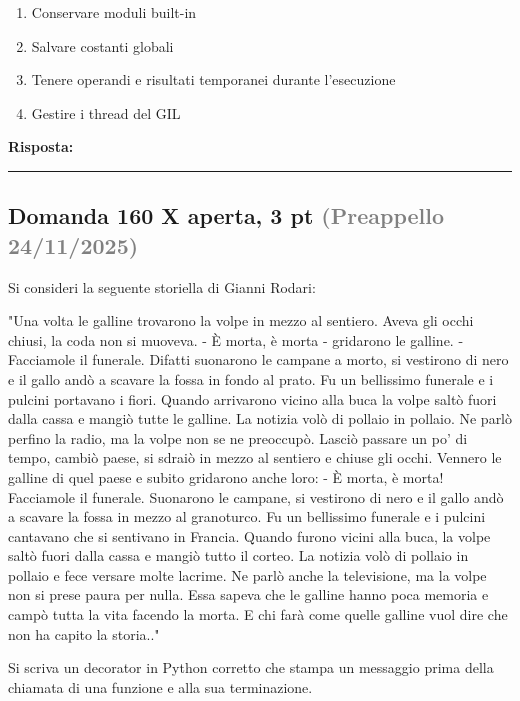 \documentclass[a4paper,11pt]{article}
\begin{document}
\begin{enumerate}[label=\alph*)]
\item Conservare moduli built-in
\item Salvare costanti globali
\item Tenere operandi e risultati temporanei durante l'esecuzione
\item Gestire i thread del GIL
\end{enumerate}
\vspace{0.2cm}
\noindent\textbf{Risposta:}\par
\vspace{1.5cm}\hrule


\subsection*{Domanda 160 X \hfill {\small aperta, 3 pt \textcolor{gray}{(Preappello 24/11/2025)}}}
\begin{tcolorbox}[colback=gray!8,colframe=gray!50,title=Contesto]
Si consideri la seguente storiella di Gianni Rodari:

"Una volta le galline trovarono la volpe in mezzo al sentiero. Aveva gli occhi chiusi, la coda non si muoveva. - È morta, è morta - gridarono le galline. - Facciamole il funerale. Difatti suonarono le campane a morto, si vestirono di nero e il gallo andò a scavare la fossa in fondo al prato. Fu un bellissimo funerale e i pulcini portavano i fiori. Quando arrivarono vicino alla buca la volpe saltò fuori dalla cassa e mangiò tutte le galline.
La notizia volò di pollaio in pollaio. Ne parlò perfino la radio, ma la volpe non se ne preoccupò. Lasciò passare un po' di tempo, cambiò paese, si sdraiò in mezzo al sentiero e chiuse gli occhi. Vennero le galline di quel paese e subito gridarono anche loro: - È morta, è morta! Facciamole il funerale.
Suonarono le campane, si vestirono di nero e il gallo andò a scavare la fossa in mezzo al granoturco. Fu un bellissimo funerale e i pulcini cantavano che si sentivano in Francia. Quando furono vicini alla buca, la volpe saltò fuori dalla cassa e mangiò tutto il corteo.
La notizia volò di pollaio in pollaio e fece versare molte lacrime. Ne parlò anche la televisione, ma la volpe non si prese paura per nulla. Essa sapeva che le galline hanno poca memoria e campò tutta la vita facendo la morta. E chi farà come quelle galline vuol dire che non ha capito la storia.."
\end{tcolorbox}
Si scriva un decorator in Python corretto che stampa un messaggio prima della chiamata di una funzione e alla sua terminazione.
\end{document}

